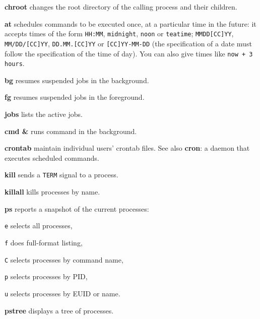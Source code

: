 \begin{compactenum}
	\item [\cmdcore] \textbf{chroot} changes the root directory of the calling process and their children.
\end{compactenum}

\begin{compactenum}
	\item [\cmdvar] \textbf{at} schedules commands to be executed once, 
	at a particular time in the future: it accepts times of the form 
	\texttt{HH:MM}, \texttt{midnight}, \texttt{noon} or \texttt{teatime}; 
	\texttt{MMDD[CC]YY}, \texttt{MM/DD/[CC]YY}, \texttt{DD.MM.[CC]YY} or 
	\texttt{[CC]YY-MM-DD} (the specification of a date 
	must follow the specification of the time of day).
	You can also give times like \texttt{now + 3 hours}.
\end{compactenum}

\begin{compactenum}
	\item [\cmdvar] \textbf{bg} resumes suspended jobs in the background.
	\item [\cmdvar] \textbf{fg} resumes suspended jobs in the foreground.
	\item [\cmdvar] \textbf{jobs} lists the active jobs.
	\item [\cmdvar] \textbf{cmd \&} runs command in the background.
\end{compactenum}

\begin{compactenum}
	\item [\cmdvar] \textbf{crontab} maintain individual users' crontab files.
	See also \textbf{cron}: a daemon that executes scheduled commands.
\end{compactenum}

\begin{compactenum}
	\item [\cmdutil] \textbf{kill} sends a \texttt{TERM} signal to a process.
	\item [\cmdvar] \textbf{killall} kills processes by name.
\end{compactenum}

\begin{compactenum}
	\item [\cmdvar] \textbf{ps} reports a snapshot of the current processes:
	\item [\texttt{e}] selects all processes,
	\item [\texttt{f}] does full-format listing,
	\item [\texttt{C}] selects processes by command name,
	\item [\texttt{p}] selects processes by PID,
	\item [\texttt{u}] selects processes by EUID or name. 
	\item [\cmdvar] \textbf{pstree} displays a tree of processes.
\end{compactenum}

